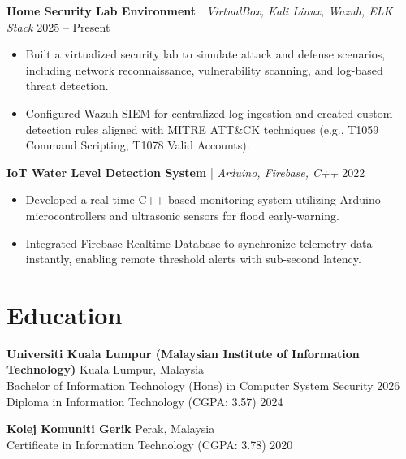 \documentclass[a4paper,10pt]{article}
\begin{document}
\vspace{0.5em}
\noindent
\textbf{Home Security Lab Environment} | \textit{VirtualBox, Kali Linux, Wazuh, ELK Stack} \hfill 2025 -- Present
\begin{itemize}[leftmargin=0.2in]
    \item Built a virtualized security lab to simulate attack and defense scenarios, including network reconnaissance, vulnerability scanning, and log-based threat detection.
    \item Configured Wazuh SIEM for centralized log ingestion and created custom detection rules aligned with MITRE ATT\&CK techniques (e.g., T1059 Command Scripting, T1078 Valid Accounts).
\end{itemize}

\vspace{0.5em}
\noindent
\textbf{IoT Water Level Detection System} | \textit{Arduino, Firebase, C++} \hfill 2022
\begin{itemize}[leftmargin=0.2in]
    \item Developed a real-time C++ based monitoring system utilizing Arduino microcontrollers and ultrasonic sensors for flood early-warning.
    \item Integrated Firebase Realtime Database to synchronize telemetry data instantly, enabling remote threshold alerts with sub-second latency.
\end{itemize}

\section*{Education}
\noindent
\textbf{Universiti Kuala Lumpur (Malaysian Institute of Information Technology)} \hfill Kuala Lumpur, Malaysia \\
Bachelor of Information Technology (Hons) in Computer System Security \hfill 2026 \\
Diploma in Information Technology (CGPA: 3.57) \hfill 2024

\vspace{0.3em}
\noindent
\textbf{Kolej Komuniti Gerik} \hfill Perak, Malaysia \\
Certificate in Information Technology (CGPA: 3.78) \hfill 2020

\end{document}
